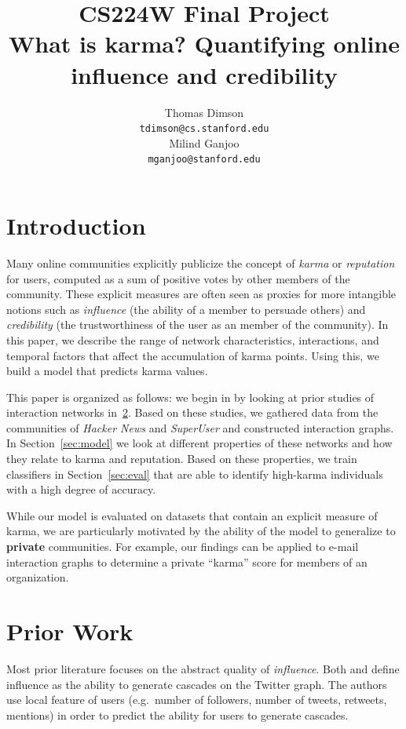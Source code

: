 \documentclass[11pt]{article}
\title{{\small CS224W Final Project} \\ What is karma? Quantifying online influence and credibility}
\author{Thomas Dimson \\
  {\tt tdimson@cs.stanford.edu}
  \\\And
  Milind Ganjoo \\
  {\tt mganjoo@stanford.edu}
}
\date{}
\begin{document}
\maketitle

\newcommand{\citet}[1]{\cite{#1}}


\section{Introduction}
Many online communities explicitly publicize the concept of \textit{karma} or
\textit{reputation} for users, computed as a sum of positive votes by other members of
the community. These explicit measures are often seen as proxies for more
intangible notions such as \textit{influence} (the ability of a member to
persuade others) and \textit{credibility} (the trustworthiness of the user as an
member of the community). In this paper, we describe the range of network
characteristics, interactions, and temporal factors that affect the accumulation
of karma points. Using this, we build a model that predicts karma values.

This paper is organized as follows: we begin in by looking at prior studies of
interaction networks in~\ref{sec:prior}. Based on these studies, we gathered
data from the communities of \textit{Hacker News} and \textit{SuperUser} and
constructed interaction graphs. In Section~\ref{sec:model} we look at different
properties of these networks and how they relate to karma and reputation. Based
on these properties, we train classifiers in Section~\ref{sec:eval} that are able 
to identify high-karma individuals with a high degree of accuracy.

While our model is evaluated on datasets that contain an explicit
measure of karma, we are particularly motivated by the ability of the
model to generalize to \textbf{private} communities. For example, our findings
can be applied to e-mail interaction graphs to determine a private ``karma'' 
score for members of an organization.

\section{Prior Work}
\label{sec:prior}

Most prior literature focuses on the abstract quality of \textit{influence}.
Both \citet{bakshy2011everyone} and \citet{cha2010measuring} define
influence as the ability to generate cascades on the Twitter graph. The authors
use local feature of users (e.g.\ number of followers, number of tweets,
retweets, mentions) in order to predict the ability for users to generate
cascades.
\end{document}
